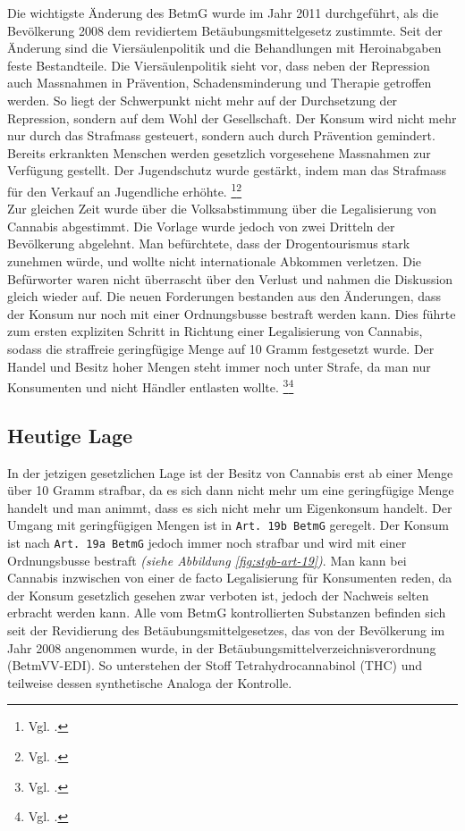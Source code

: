 \documentclass[../main.tex]{subfiles}
\begin{document}
	 \noindent
	 Die wichtigste Änderung des BetmG wurde im Jahr 2011 durchgeführt, als die Bevölkerung 2008 dem revidiertem Betäubungsmittelgesetz zustimmte. 
	 Seit der Änderung sind die Viersäulenpolitik und die Behandlungen mit Heroinabgaben feste Bestandteile. 
	 Die Viersäulenpolitik sieht vor, dass neben der Repression auch Massnahmen in Prävention, Schadensminderung und Therapie getroffen werden.
	 So liegt der Schwerpunkt nicht mehr auf der Durchsetzung der Repression, sondern auf dem Wohl der Gesellschaft.
	 Der Konsum wird nicht mehr nur durch das Strafmass gesteuert, sondern auch durch Prävention gemindert. 
	 Bereits erkrankten Menschen werden gesetzlich vorgesehene Massnahmen zur Verfügung gestellt.
	 Der Jugendschutz wurde gestärkt, indem man das Strafmass für den Verkauf an Jugendliche erhöhte.%
	 \footnote{Vgl. \cite{infoset-01}.}\footnote{Vgl. \cite{parlament-01}.}\\
	 
	 \noindent
	 Zur gleichen Zeit wurde über die Volksabstimmung über die Legalisierung von Cannabis abgestimmt.
	 Die Vorlage wurde jedoch von zwei Dritteln der Bevölkerung abgelehnt.
	 Man befürchtete, dass der Drogentourismus stark zunehmen würde, und wollte nicht internationale Abkommen verletzen.
	 Die Befürworter waren nicht überrascht über den Verlust und nahmen die Diskussion gleich wieder auf. 
	 Die neuen Forderungen bestanden aus den Änderungen, dass der Konsum nur noch mit einer Ordnungsbusse bestraft werden kann. 
	 Dies führte zum ersten expliziten Schritt in Richtung einer Legalisierung von Cannabis, sodass die straffreie geringfügige Menge auf 10 Gramm festgesetzt wurde.
	 Der Handel und Besitz hoher Mengen steht immer noch unter Strafe, da man nur Konsumenten und nicht Händler entlasten wollte.%
	 \footnote{Vgl. \cite{infoset-02}.}\footnote{Vgl. \cite{parlament-02}.}
	 
	 
	 \subsection{Heutige Lage}
	 In der jetzigen gesetzlichen Lage ist der Besitz von Cannabis erst ab einer Menge über 10 Gramm strafbar, da es sich dann nicht mehr um eine geringfügige Menge handelt und man animmt, dass es sich nicht mehr um Eigenkonsum handelt.
	 Der Umgang mit geringfügigen Mengen ist in \texttt{Art. 19b BetmG} geregelt.
	 Der Konsum ist nach \texttt{Art. 19a BetmG} jedoch immer noch strafbar und wird mit einer Ordnungsbusse bestraft \textit{(siehe Abbildung \ref{fig:stgb-art-19})}. 
	 Man kann bei Cannabis inzwischen von einer de facto Legalisierung für Konsumenten reden, da der Konsum gesetzlich gesehen zwar verboten ist, jedoch der Nachweis selten erbracht werden kann. 
	 Alle vom BetmG kontrollierten Substanzen befinden sich seit der Revidierung des Betäubungsmittelgesetzes, das von der Bevölkerung im Jahr 2008 angenommen wurde, in der Betäubungsmittelverzeichnisverordnung (BetmVV-EDI). 
	 So unterstehen der Stoff Tetrahydrocannabinol (THC) und teilweise dessen synthetische Analoga der Kontrolle.\vspace{2pt}
	 
\end{document}
